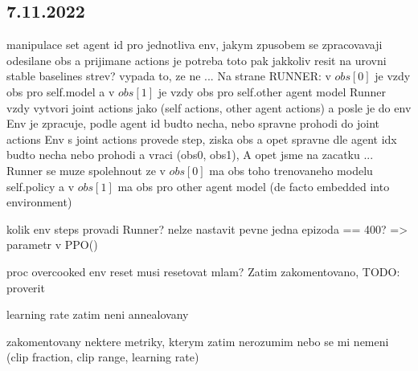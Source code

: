 \documentclass{report}
\begin{document}
\subsection*{7.11.2022}
\begin{list}{}{}
    \item manipulace set agent id pro jednotliva env, jakym zpusobem se zpracovavaji odesilane obs a prijimane actions
        je potreba toto pak jakkoliv resit na urovni stable baselines strev?
        vypada to, ze ne ... Na strane RUNNER: v $obs[0]$ je vzdy obs pro self.model a v $obs[1]$ je vzdy obs pro self.other agent model
        Runner vzdy vytvori joint actions jako (self actions, other agent actions) a posle je do env
        Env je zpracuje, podle agent id budto necha, nebo spravne prohodi do joint actions
        Env s joint actions provede step, ziska obs a opet spravne dle agent idx budto necha nebo prohodi a vraci (obs0, obs1),
            A opet jsme na zacatku ...  Runner se muze spolehnout ze v $obs[0]$ ma obs toho trenovaneho modelu self.policy a v $obs[1]$ ma obs pro other agent model (de facto embedded into environment)

    \item kolik env steps provadi Runner? nelze nastavit pevne jedna epizoda == 400? => parametr v PPO()
    \item proc overcooked env reset musi resetovat mlam? Zatim zakomentovano, TODO: proverit
    \item learning rate zatim neni annealovany
    \item zakomentovany nektere metriky, kterym zatim nerozumim nebo se mi nemeni (clip fraction, clip range, learning rate)
\end{list}
\end{document}

